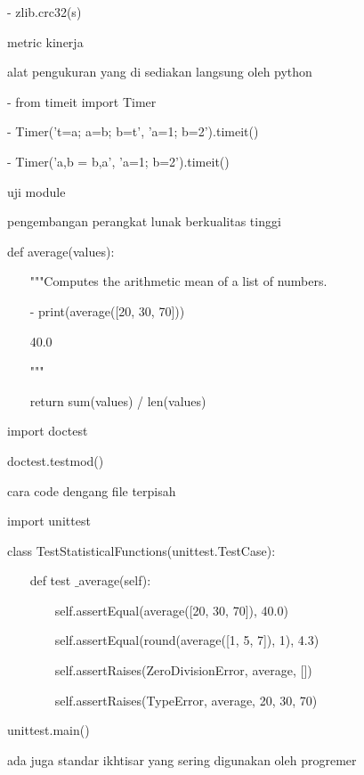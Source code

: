 \noindent 
- zlib.crc32(s) \par
{} \par
\noindent 
metric kinerja \par
\noindent 
alat pengukuran yang di sediakan langsung oleh python \par
\noindent 
- from timeit import Timer \par
\noindent 
- Timer('t=a; a=b; b=t', 'a=1; b=2').timeit() \par
{} \par
\noindent 
- Timer('a,b = b,a', 'a=1; b=2').timeit() \par
{} \par
\noindent 
uji module  \par
\noindent 
pengembangan perangkat lunak berkualitas tinggi \par
\noindent 
def average(values): \par
\noindent 
~~~ """Computes the arithmetic mean of a list of numbers. \par
\vspace{12pt}
\noindent 
~~~ - print(average([20, 30, 70])) \par
\noindent 
~~~ 40.0 \par
\noindent 
~~~ """ \par
\noindent 
~~~ return sum(values) / len(values) \par
\noindent 
import doctest \par
\noindent 
doctest.testmod()~~  \par
\noindent 
cara code dengang file terpisah \par
\noindent 
import unittest \par
\noindent 
class TestStatisticalFunctions(unittest.TestCase): \par
\noindent 
~~~ def test $  \_  $average(self): \par
\noindent 
~~~~~~~ self.assertEqual(average([20, 30, 70]), 40.0) \par
\noindent 
~~~~~~~ self.assertEqual(round(average([1, 5, 7]), 1), 4.3) \par
\noindent 
~~~~~~~ self.assertRaises(ZeroDivisionError, average, []) \par
\noindent 
~~~~~~~ self.assertRaises(TypeError, average, 20, 30, 70) \par
\noindent 
unittest.main()  \par
\noindent 
ada juga standar ikhtisar yang sering digunakan oleh progremer  \par
